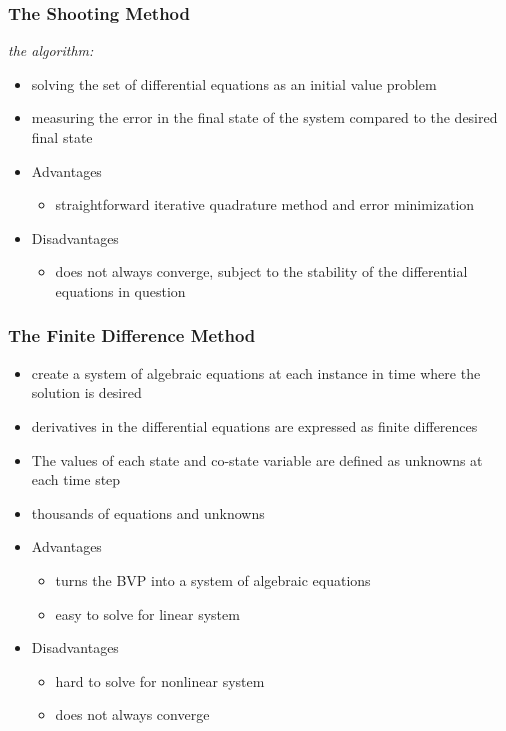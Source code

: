 \documentclass{beamer}
\begin{document}
\begin{frame}
\frametitle{The Shooting Method}

\textit{the algorithm:}

\begin{itemize}
\item solving the set of differential equations as an initial value problem

\item measuring the error in the final state of the system compared to the desired final state

\item Advantages
    \begin{itemize} 
        \item straightforward iterative quadrature method and error minimization
    \end{itemize}
\item Disadvantages
    \begin{itemize} 
        \item does not always converge, subject to the stability of the differential equations in question
    \end{itemize}
\end{itemize}

\end{frame}




\begin{frame}
\frametitle{The Finite Difference Method}

\begin{itemize}

\item create a system of algebraic equations at each instance in time where the solution is desired
\item derivatives in the differential equations are expressed as finite differences
\item The values of each state and co-state variable are defined as unknowns at each time step
\item thousands of equations and unknowns
\end{itemize}

\begin{itemize}
\item Advantages
    \begin{itemize} 
        \item turns the BVP into a system of algebraic equations
        \item easy to solve for linear system
    \end{itemize}
\item Disadvantages
    \begin{itemize} 
        \item hard to solve for nonlinear system
        \item does not always converge 
    \end{itemize}
\end{itemize}

\end{frame}
\end{document}
